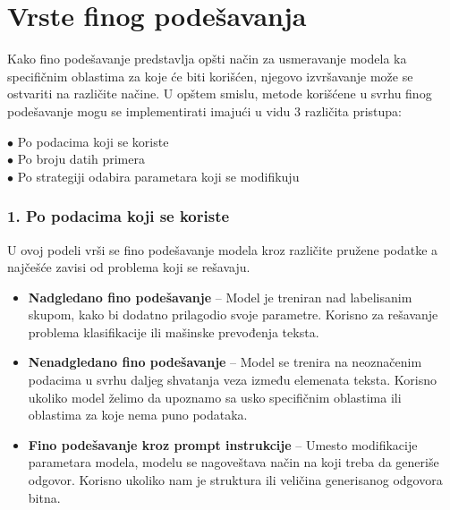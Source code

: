 \documentclass[12pt,oneside]{memoir}
\begin{document}
\section{Vrste finog podešavanja}
Kako fino podešavanje predstavlja opšti način za usmeravanje modela ka specifičnim oblastima za koje će biti korišćen, njegovo izvršavanje može se ostvariti na različite načine. U opštem smislu, metode korišćene u svrhu finog podešavanje mogu se implementirati imajući u vidu 3 različita pristupa:
\begin{description}
	\item[$\bullet$ Po podacima koji se koriste] 
	\item[$\bullet$ Po broju datih primera] 
	\item[$\bullet$ Po strategiji odabira parametara koji se modifikuju] 
\end{description}

\subsubsection{1. Po podacima koji se koriste}
U ovoj podeli vrši se fino podešavanje modela kroz različite pružene podatke a najčešće zavisi od problema koji se rešavaju. 
\begin{itemize}
	\item \textbf{Nadgledano fino podešavanje} – Model je treniran nad labelisanim skupom, kako bi dodatno prilagodio svoje parametre. Korisno za rešavanje problema klasifikacije ili mašinske prevođenja teksta. 
	\item \textbf{Nenadgledano fino podešavanje} – Model se trenira na neoznačenim podacima u svrhu daljeg shvatanja veza između elemenata teksta. Korisno ukoliko model želimo da upoznamo sa usko specifičnim oblastima ili oblastima za koje nema puno podataka. 
	\item \textbf{Fino podešavanje kroz prompt instrukcije} – Umesto modifikacije parametara modela, modelu se nagoveštava način na koji treba da generiše odgovor. Korisno ukoliko nam je struktura ili veličina generisanog odgovora bitna.
\end{itemize}
\end{document}
